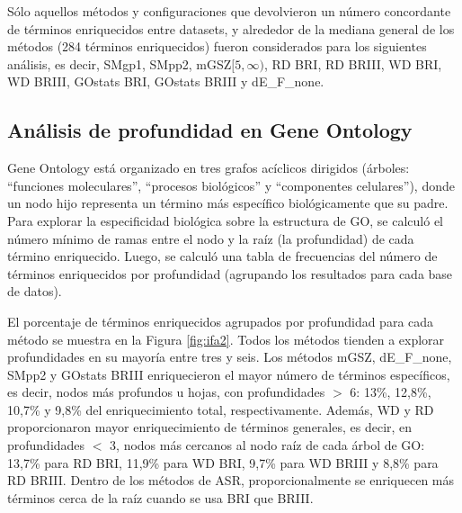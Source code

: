 \documentclass[12pt,twoside]{reedthesis}
\begin{document}
\par

Sólo aquellos métodos y configuraciones que devolvieron un número concordante de términos enriquecidos entre datasets, y alrededor de la mediana general de los métodos (284 términos enriquecidos) fueron considerados para los siguientes análisis, es decir, SMgp1, SMpp2, mGSZ\([5,\infty)\), RD BRI, RD BRIII, WD BRI, WD BRIII, GOstats BRI, GOstats BRIII y dE\_F\_none.

\hypertarget{anuxe1lisis-de-profundidad-en-gene-ontology}{%
\subsection{Análisis de profundidad en Gene Ontology}\label{anuxe1lisis-de-profundidad-en-gene-ontology}}

\par

Gene Ontology está organizado en tres grafos acíclicos dirigidos (árboles: ``funciones moleculares'', ``procesos biológicos'' y ``componentes celulares''), donde un nodo hijo representa un término más específico biológicamente que su padre. Para explorar la especificidad biológica sobre la estructura de GO, se calculó el número mínimo de ramas entre el nodo y la raíz (la profundidad) de cada término enriquecido. Luego, se calculó una tabla de frecuencias del número de términos enriquecidos por profundidad (agrupando los resultados para cada base de datos).

\par

El porcentaje de términos enriquecidos agrupados por profundidad para cada método se muestra en la Figura \ref{fig:ifa2}. Todos los métodos tienden a explorar profundidades en su mayoría entre tres y seis. Los métodos mGSZ, dE\_F\_none, SMpp2 y GOstats BRIII enriquecieron el mayor número de términos específicos, es decir, nodos más profundos u hojas, con profundidades \(>\) 6: 13\%, 12,8\%, 10,7\% y 9,8\% del enriquecimiento total, respectivamente. Además, WD y RD proporcionaron mayor enriquecimiento de términos generales, es decir, en profundidades \(<\) 3, nodos más cercanos al nodo raíz de cada árbol de GO: 13,7\% para RD BRI, 11,9\% para WD BRI, 9,7\% para WD BRIII y 8,8\% para RD BRIII. Dentro de los métodos de ASR, proporcionalmente se enriquecen más términos cerca de la raíz cuando se usa BRI que BRIII.

\par
\end{document}
